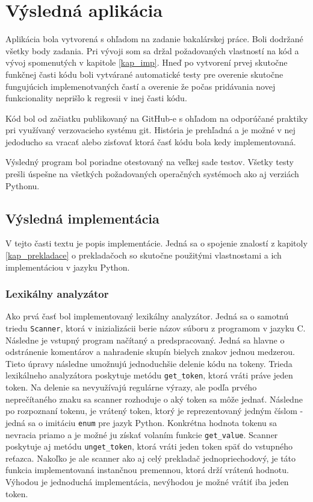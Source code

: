 \chapter{Výsledná aplikácia}
Aplikácia bola vytvorená s ohľadom na zadanie bakalárskej práce. Boli dodržané všetky body zadania. Pri vývoji som sa držal požadovaných vlastností na kód a vývoj spomenutých v kapitole \ref{kap_imp}. Hneď po vytvorení prvej skutočne funkčnej časti kódu boli vytvárané automatické testy pre overenie skutočne fungujúcich implemenotvaných častí a overenie že počas pridávania novej funkcionality neprišlo k regresii v inej časti kódu. 

Kód bol od začiatku publikovaný na GitHub-e s ohľadom na odporúčané praktiky pri využívaný verzovacieho systému git. História je prehľadná a je možné v nej jedoducho sa vracať alebo zisťovať ktorá časť kódu bola kedy implementovaná.

Výsledný program bol poriadne otestovaný na veľkej sade testov. Všetky testy prešli úspešne na všetkých požadovaných operačných systémoch ako aj verziách Pythonu.



\section{Výsledná implementácia}
V tejto časti textu je popis implementácie. Jedná sa o spojenie znalostí z kapitoly \ref{kap_prekladace} o prekladačoch so skutočne použitými vlastnostami a ich implementáciou v jazyku Python.
\subsection{Lexikálny analyzátor}
Ako prvá časť bol implementovaný lexikálny analyzátor. Jedná sa o samotnú triedu \texttt{Scanner}, ktorá v inizializácii berie názov súboru z programom v jazyku C. Následne je vstupný program načítaný a predspracovaný. Jedná sa hlavne o odstránenie komentárov a nahradenie skupín bielych znakov jednou medzerou. Tieto úpravy následne umožnujú jednoduchšie delenie kódu na tokeny. Trieda lexikálneho analyzátora poskytuje metódu \texttt{get\_token}, ktorá vráti práve jeden token. Na delenie sa nevyužívajú regulárne výrazy, ale podľa prvého neprečítaného znaku sa scanner rozhoduje o aký token sa môže jednať. Následne po rozpoznaní tokenu, je vrátený token, ktorý je reprezentovaný jedným číslom - jedná sa o imitáciu \texttt{enum} pre jazyk Python. Konkrétna hodnota tokenu sa nevracia priamo a je možné ju získať volaním funkcie \texttt{get\_value}. Scanner poskytuje aj metódu \texttt{unget\_token}, ktorá vráti jeden token späť do vstupného reťazca. Nakoľko je ale scanner ako aj celý prekladač jednopriechodový, je táto funkcia implementovaná instančnou premennou, ktorá drží vrátenú hodnotu. Výhodou je jednoduchá implementácia, nevýhodou je možné vrátiť iba jeden token.

